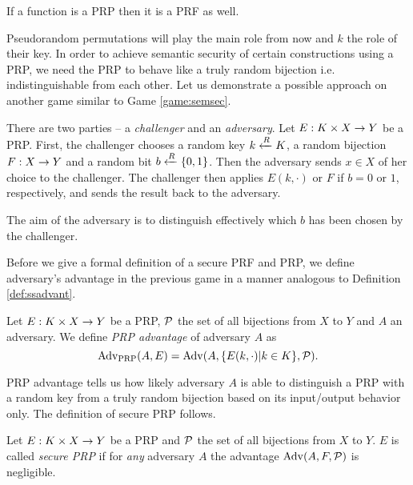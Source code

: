 \begin{note}
	If a function is a PRP then it is a PRF as well.
\end{note}

Pseudorandom permutations will play the main role from now and $k$ the role of their key. In order to achieve semantic security of certain constructions using a PRP, we need the PRP to behave like a truly random bijection i.e. indistinguishable from each other. Let us demonstrate a possible approach on another game similar to Game \ref{game:semsec}.

\begin{game}
\label{game:prp}
	There are two parties -- a {\em challenger} and an {\em adversary}. Let $E:K\times X\rightarrow Y$ be a PRP. First, the challenger chooses a random key $k\xleftarrow{R} K$, a random bijection $F:X\rightarrow Y$ and a random bit $b\xleftarrow{R}\{0,1\}$. Then the adversary sends $x\in X$ of her choice to the challenger. The challenger then applies $E(k,\cdot)$ or $F$ if $b=0$ or $1$, respectively, and sends the result back to the adversary.
	
	The aim of the adversary is to distinguish effectively which $b$ has been chosen by the challenger.
\end{game}

Before we give a formal definition of a secure PRF and PRP, we define adversary's advantage in the previous game in a manner analogous to Definition \ref{def:ssadvant}.

\begin{defn}
\label{def:prpadvant}
	Let $E: K\times X\rightarrow Y$ be a PRP, $\cal P$ the set of all bijections from $X$ to $Y$ and $A$ an adversary. We define {\em PRP advantage} of adversary $A$ as
	\[
		\operatorname*{Adv_{PRP}}(A,E) = \operatorname*{Adv}(A,\{E(k,\cdot)|k\in K\},{\cal P}) .
	\]
\end{defn}

PRP advantage tells us how likely adversary $A$ is able to distinguish a PRP with a random key from a truly random bijection based on its input/output behavior only. The definition of secure PRP follows.

\begin{defn}
\label{def:secprp}
	Let $E: K\times X\rightarrow Y$ be a PRP and $\cal P$ the set of all bijections from $X$ to $Y$. $E$ is called {\em secure PRP} if for {\em any} adversary $A$ the advantage $\operatorname*{Adv}(A,F,{\cal P})$ is negligible.   %
\end{defn}

